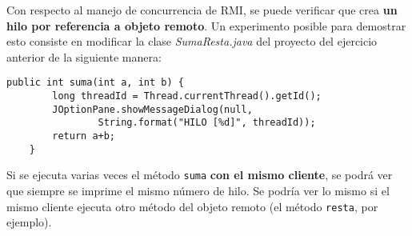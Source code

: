 Con respecto al manejo de concurrencia de RMI, se puede verificar que crea \textbf{un hilo por referencia a objeto remoto}. Un experimento posible para demostrar esto consiste en modificar la clase \emph{SumaResta.java} del proyecto del ejercicio anterior de la siguiente manera:

\begin{lstlisting}[title={Modificar el método \texttt{suma} para poder ver el hilo en el que corre}]
    public int suma(int a, int b) {
        long threadId = Thread.currentThread().getId();
        JOptionPane.showMessageDialog(null, 
                String.format("HILO [%d]", threadId));
        return a+b;
    }
\end{lstlisting}

Si se ejecuta varias veces el método \texttt{suma} \textbf{con el mismo cliente}, se podrá ver que siempre se imprime el mismo número de hilo. Se podría ver lo mismo si el mismo cliente ejecuta otro método del objeto remoto (el método \texttt{resta}, por ejemplo).  


\clearpage
\printbibliography



